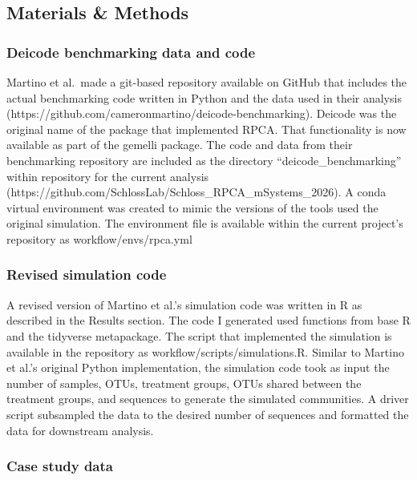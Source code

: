 \documentclass[
  11pt,
]{article}
\begin{document}
\subsection{Materials \& Methods}\label{materials-methods}

\subsubsection{Deicode benchmarking data and
code}\label{deicode-benchmarking-data-and-code}

Martino et al.~made a git-based repository available on GitHub that
includes the actual benchmarking code written in Python and the data
used in their analysis
(https://github.com/cameronmartino/deicode-benchmarking). Deicode was
the original name of the package that implemented RPCA. That
functionality is now available as part of the gemelli package. The code
and data from their benchmarking repository are included as the
directory ``deicode\_benchmarking'' within repository for the current
analysis (https://github.com/SchlossLab/Schloss\_RPCA\_mSystems\_2026).
A conda virtual environment was created to mimic the versions of the
tools used the original simulation. The environment file is available
within the current project's repository as workflow/envs/rpca.yml

\subsubsection{Revised simulation code}\label{revised-simulation-code}

A revised version of Martino et al.'s simulation code was written in R
as described in the Results section. The code I generated used functions
from base R and the tidyverse metapackage. The script that implemented
the simulation is available in the repository as
workflow/scripts/simulations.R. Similar to Martino et al.'s original
Python implementation, the simulation code took as input the number of
samples, OTUs, treatment groups, OTUs shared between the treatment
groups, and sequences to generate the simulated communities. A driver
script subsampled the data to the desired number of sequences and
formatted the data for downstream analysis.

\subsubsection{Case study data}\label{case-study-data}
\end{document}
